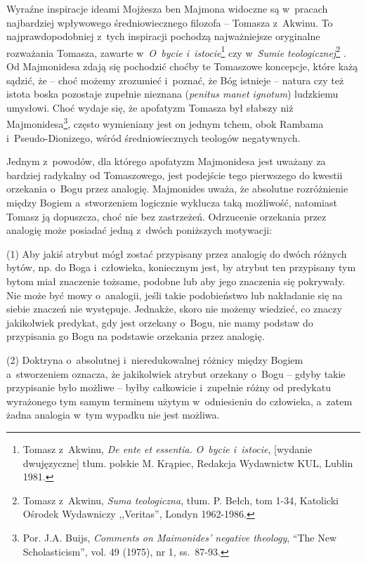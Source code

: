 Wyraźne inspiracje ideami Mojżesza ben Majmona widoczne są w~pracach najbardziej wpływowego średniowiecznego filozofa -- Tomasza z~Akwinu. To najprawdopodobniej z~tych inspiracji pochodzą najważniejsze oryginalne rozważania Tomasza, zawarte w~\textit{O~bycie i~istocie}\footnote{Tomasz z~Akwinu, \textit{De ente et essentia.} \textit{O~bycie i~istocie}, [wydanie dwujęzyczne] tłum. polskie M. Krąpiec, Redakcja Wydawnictw KUL, Lublin 1981.}
czy w~\textit{Sumie teologicznej}\footnote{Tomasz z~Akwinu, \textit{Suma teologiczna}, tłum. P. Bełch, tom 1-34, Katolicki Ośrodek Wydawniczy ,,Veritas'', Londyn 1962-1986.}
. Od Majmonidesa zdają się pochodzić choćby te Tomaszowe koncepcje, które każą sądzić, że -- choć możemy zrozumieć i~poznać, że Bóg istnieje -- natura czy też istota boska pozostaje zupełnie nieznana (\textit{penitus manet ignotum}) ludzkiemu umysłowi. Choć wydaje się, że apofatyzm Tomasza był słabszy niż Majmonidesa\footnote{Por. J.A. Buijs, \textit{Comments on Maimonides' negative theology}, ``The New Scholasticism'', vol. 49 (1975), nr 1, ss.~87-93.}, często wymieniany jest on jednym tchem, obok Rambama i~Pseudo-Dionizego, wśród średniowiecznych teologów negatywnych.

Jednym z~powodów, dla którego apofatyzm Majmonidesa jest uważany za bardziej radykalny od Tomaszowego, jest podejście tego pierwszego do kwestii orzekania o~Bogu przez analogię. Majmonides uważa, że absolutne rozróżnienie między Bogiem a~stworzeniem logicznie wyklucza taką możliwość, natomiast Tomasz ją dopuszcza, choć nie bez zastrzeżeń. Odrzucenie orzekania przez analogię może posiadać jedną z~dwóch poniższych motywacji:

(1) Aby jakiś atrybut mógł zostać przypisany przez analogię do dwóch różnych bytów, np. do Boga i~człowieka, koniecznym jest, by atrybut ten przypisany tym bytom miał znaczenie tożsame, podobne lub aby jego znaczenia się pokrywały. Nie może być mowy o~analogii, jeśli takie podobieństwo lub nakładanie się na siebie znaczeń nie występuje. Jednakże, skoro nie możemy wiedzieć, co znaczy jakikolwiek predykat, gdy jest orzekany o~Bogu, nie mamy podstaw do przypisania go Bogu na podstawie orzekania przez analogię.

(2) Doktryna o~absolutnej i~nieredukowalnej różnicy między Bogiem a~stworzeniem oznacza, że jakikolwiek atrybut orzekany o~Bogu -- gdyby takie przypisanie było możliwe -- byłby całkowicie i~zupełnie różny od predykatu wyrażonego tym samym terminem użytym w~odniesieniu do człowieka, a~zatem żadna analogia w~tym wypadku nie jest możliwa.


